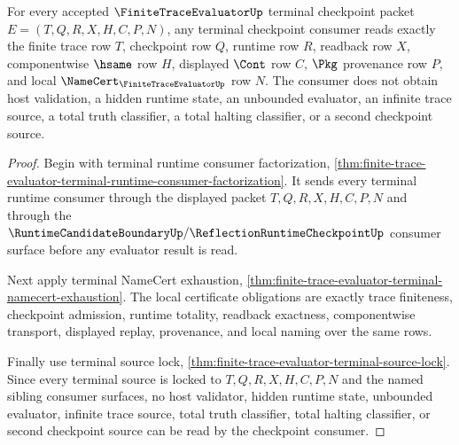 \begin{theorem}
\label{thm:finitetrace-evaluator-terminal-checkpoint-exactness}
For every accepted $\FiniteTraceEvaluatorUp$ terminal checkpoint packet
$E=(T,Q,R,X,H,C,P,N)$, any terminal checkpoint consumer reads exactly the
finite trace row $T$, checkpoint row $Q$, runtime row $R$, readback row $X$,
componentwise $\hsame$ row $H$, displayed $\Cont$ row $C$, $\Pkg$ provenance
row $P$, and local $\NameCert_{\FiniteTraceEvaluatorUp}$ row $N$. The consumer
does not obtain host validation, a hidden runtime state, an unbounded evaluator,
an infinite trace source, a total truth classifier, a total halting classifier,
or a second checkpoint source.
\end{theorem}
\begin{proof}
Begin with terminal runtime consumer factorization,
\autoref{thm:finite-trace-evaluator-terminal-runtime-consumer-factorization}.
It sends every terminal runtime consumer through the displayed packet
$T,Q,R,X,H,C,P,N$ and through the
$\RuntimeCandidateBoundaryUp/\ReflectionRuntimeCheckpointUp$ consumer surface
before any evaluator result is read.

Next apply terminal NameCert exhaustion,
\autoref{thm:finite-trace-evaluator-terminal-namecert-exhaustion}. The local
certificate obligations are exactly trace finiteness, checkpoint admission,
runtime totality, readback exactness, componentwise transport, displayed
replay, provenance, and local naming over the same rows.

Finally use terminal source lock,
\autoref{thm:finite-trace-evaluator-terminal-source-lock}. Since every
terminal source is locked to $T,Q,R,X,H,C,P,N$ and the named sibling consumer
surfaces, no host validator, hidden runtime state, unbounded evaluator,
infinite trace source, total truth classifier, total halting classifier, or
second checkpoint source can be read by the checkpoint consumer.
\end{proof}


